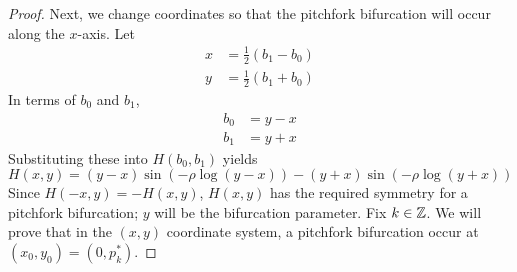 \documentclass[thesis.tex]{subfiles}
\begin{document}
\begin{lemma}
\begin{proof}
Next, we change coordinates so that the pitchfork bifurcation will occur along the $x$-axis. Let
\begin{align*}
x &= \frac{1}{2}(b_1 - b_0) \\
y &= \frac{1}{2}(b_1 + b_0)
\end{align*}
In terms of $b_0$ and $b_1$,
\begin{align*}
b_0 &= y - x \\
b_1 &= y + x
\end{align*}
Substituting these into $H(b_0, b_1)$ yields
\begin{equation}\label{Hxy}
H(x, y) = 
(y - x) \sin \left( -\rho \log(y - x) \right) - (y + x) \sin \left( - \rho \log (y + x) \right)
\end{equation}
Since $H(-x, y) = -H(x, y)$, $H(x,y)$ has the required symmetry for a pitchfork bifurcation; $y$ will be the bifurcation parameter. Fix $k \in \mathbb{Z}$. We will prove that in the $(x,y)$ coordinate system, a pitchfork bifurcation occur at $(x_0, y_0) = \left(0, p^*_k \right)$.


\end{proof}
\end{lemma}
\end{document}
